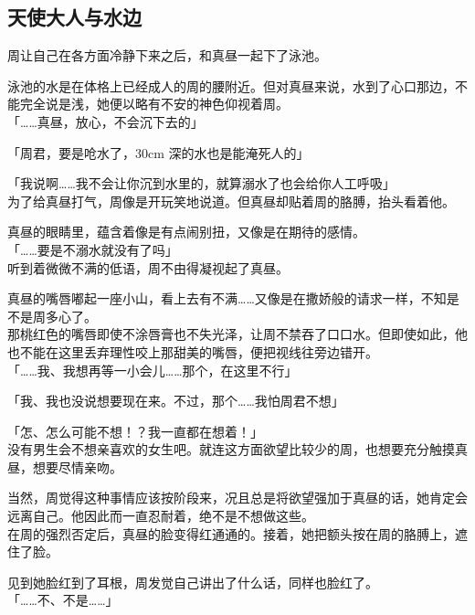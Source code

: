 \subsection{天使大人与水边}

周让自己在各方面冷静下来之后，和真昼一起下了泳池。

泳池的水是在体格上已经成人的周的腰附近。但对真昼来说，水到了心口那边，不能完全说是浅，她便以略有不安的神色仰视着周。\\

「……真昼，放心，不会沉下去的」

「周君，要是呛水了，30cm 深的水也是能淹死人的」

「我说啊……我不会让你沉到水里的，就算溺水了也会给你人工呼吸」\\

为了给真昼打气，周像是开玩笑地说道。但真昼却贴着周的胳膊，抬头看着他。

真昼的眼睛里，蕴含着像是有点闹别扭，又像是在期待的感情。\\

「……要是不溺水就没有了吗」\\

听到着微微不满的低语，周不由得凝视起了真昼。

真昼的嘴唇嘟起一座小山，看上去有不满……又像是在撒娇般的请求一样，不知是不是周多心了。\\

那桃红色的嘴唇即使不涂唇膏也不失光泽，让周不禁吞了口口水。但即使如此，他也不能在这里丢弃理性咬上那甜美的嘴唇，便把视线往旁边错开。\\

「……我、我想再等一小会儿……那个，在这里不行」

「我、我也没说想要现在来。不过，那个……我怕周君不想」

「怎、怎么可能不想！？我一直都在想着！」\\

没有男生会不想亲喜欢的女生吧。就连这方面欲望比较少的周，也想要充分触摸真昼，想要尽情亲吻。

当然，周觉得这种事情应该按阶段来，况且总是将欲望强加于真昼的话，她肯定会远离自己。他因此而一直忍耐着，绝不是不想做这些。\\

在周的强烈否定后，真昼的脸变得红通通的。接着，她把额头按在周的胳膊上，遮住了脸。

见到她脸红到了耳根，周发觉自己讲出了什么话，同样也脸红了。\\

「……不、不是……」

